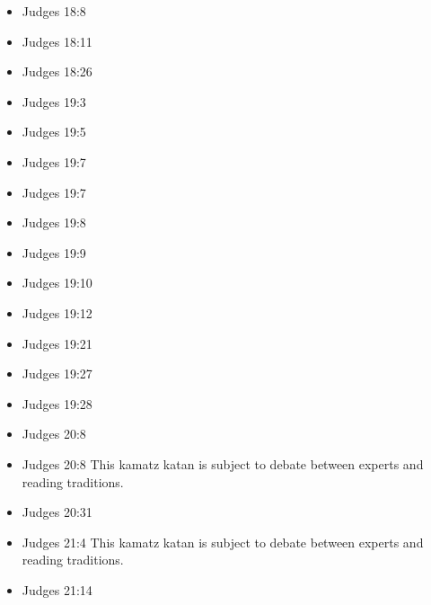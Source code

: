 \documentclass[14pt]{article}
\begin{document}
\begin{multicols}{2}
\begin{itemize}
			\item Judges 18:8
			
			\item Judges 18:11
			
			\item Judges 18:26
			
			\item Judges 19:3
			
			\item Judges 19:5
			
			\item Judges 19:7
			
			\item Judges 19:7
			
			\item Judges 19:8
			
			\item Judges 19:9
			
			\item Judges 19:10
			
			\item Judges 19:12
			
			\item Judges 19:21
					
			\item Judges 19:27
					
			\item Judges 19:28
					
			\item Judges 20:8
					
			\item Judges 20:8 This kamatz katan is subject to debate between experts and reading traditions.
					
			\item Judges 20:31
					
			\item Judges 21:4 This kamatz katan is subject to debate between experts and reading traditions.
					
			\item Judges 21:14
					
	\end{itemize}\end{multicols}
				
\end{document}

